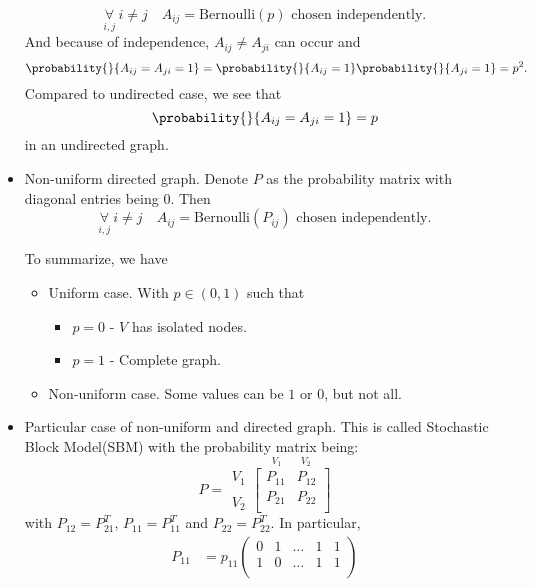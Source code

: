 \begin{itemize}
	      \[
		      \underset{i, j}{\forall}\ i\neq j\quad A_{ij}= \mathrm{Bernoulli}(p) \text{ chosen independently}.
	      \]
	      And because of independence, \(A_{ij}\neq A_{ji}\) can occur and
	      \[
		      \probability{}{A_{ij} = A_{ji} = 1} = \probability{}{A_{ij} = 1} \probability{}{ A_{ji} = 1} = p^2.
	      \]
	      Compared to undirected case, we see that
	      \[
		      \probability{}{A_{ij} = A_{ji} = 1} = p
	      \]
	      in an undirected graph.
	\item Non-uniform directed graph. Denote \(P\) as the probability matrix with diagonal entries being \(0\). Then
	      \[
		      \underset{i, j}{\forall}\ i\neq j\quad A_{ij} = \mathrm{Bernoulli}(P_{ij})\text{ chosen independently}.
	      \]
	      \begin{remark}
		      To summarize, we have
		      \begin{itemize}
			      \item Uniform case. With \(p\in(0, 1)\) such that
			            \begin{itemize}
				            \item \(p = 0\) - \(V\) has isolated nodes.
				            \item \(p = 1\) - Complete graph.
			            \end{itemize}
			      \item Non-uniform case. Some values can be \(1\) or \(0\), but not all.
		      \end{itemize}
	      \end{remark}
	\item Particular case of non-uniform and directed graph. This is called Stochastic Block Model(SBM) with the probability matrix being:
	      \[
		      P = \substack{V_1 \\ \\ V_2}\overset{V_1\qquad V_2}{\begin{bmatrix}
				      P_{11} & P_{12} \\
				      P_{21} & P_{22} \\
			      \end{bmatrix}}
	      \]
	      with \(P_{12} = P_{21}^{T}\), \(P_{11} = P_{11}^{T}\) and \(P_{22} = P_{22}^{T}\). In particular,
	      \[
		      \begin{alignedat}{3}
			      P_{11} &= p_{11}\begin{pmatrix}
				      0      & 1      & \ldots & 1      & 1      \\
				      1      & 0      & \ldots & 1      & 1      \\

\end{pmatrix}
\end{alignedat}\]
\end{itemize}
